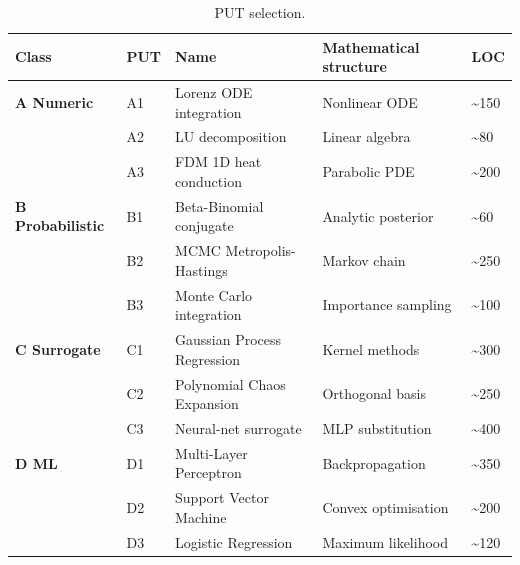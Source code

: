 \documentclass[review,12pt,authoryear]{elsarticle}
\begin{document}
{\def\LTcaptype{table} %
\begin{longtable}[]{@{}
  >{\raggedright\arraybackslash}p{}
  >{\raggedright\arraybackslash}p{}
  >{\raggedright\arraybackslash}p{}
  >{\raggedright\arraybackslash}p{}
  >{\raggedright\arraybackslash}p{}@{}}
\caption{PUT selection.}\label{tab:p2-02}\\
\toprule\noalign{}
\begin{minipage}[b]{\linewidth}\raggedright
Class
\end{minipage} & \begin{minipage}[b]{\linewidth}\raggedright
PUT
\end{minipage} & \begin{minipage}[b]{\linewidth}\raggedright
Name
\end{minipage} & \begin{minipage}[b]{\linewidth}\raggedright
Mathematical structure
\end{minipage} & \begin{minipage}[b]{\linewidth}\raggedright
LOC
\end{minipage} \\
\midrule\noalign{}
\endhead
\bottomrule\noalign{}
\endlastfoot
\textbf{A Numeric} & A1 & Lorenz ODE integration & Nonlinear ODE &
\textasciitilde150 \\
& A2 & LU decomposition & Linear algebra & \textasciitilde80 \\
& A3 & FDM 1D heat conduction & Parabolic PDE & \textasciitilde200 \\
\textbf{B Probabilistic} & B1 & Beta-Binomial conjugate & Analytic
posterior & \textasciitilde60 \\
& B2 & MCMC Metropolis-Hastings & Markov chain & \textasciitilde250 \\
& B3 & Monte Carlo integration & Importance sampling &
\textasciitilde100 \\
\textbf{C Surrogate} & C1 & Gaussian Process Regression & Kernel methods
& \textasciitilde300 \\
& C2 & Polynomial Chaos Expansion & Orthogonal basis &
\textasciitilde250 \\
& C3 & Neural-net surrogate & MLP substitution & \textasciitilde400 \\
\textbf{D ML} & D1 & Multi-Layer Perceptron & Backpropagation &
\textasciitilde350 \\
& D2 & Support Vector Machine & Convex optimisation &
\textasciitilde200 \\
& D3 & Logistic Regression & Maximum likelihood & \textasciitilde120 \\
\end{longtable}
}
\end{document}

